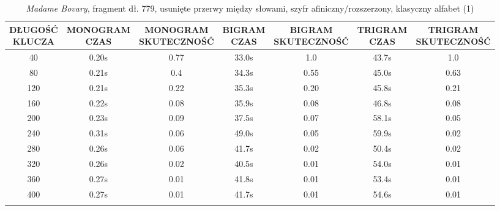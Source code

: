 \documentclass[a4paper]{article}
\theoremstyle{defn}
\theoremstyle{theorem}
\theoremstyle{lemma}
\theoremstyle{cor}
\theoremstyle{fact}
\begin{document}
\begin{center}\begin{small}\begin{longtable}{|c|c|c|c|c|c|c|}
\hline \makecell{DŁUGOŚĆ\\KLUCZA} &  \makecell{MONOGRAM\\CZAS} & \makecell{MONOGRAM\\SKUTECZNOŚĆ} & \makecell{BIGRAM\\CZAS} &  \makecell{BIGRAM\\SKUTECZNOŚĆ} & \makecell{TRIGRAM\\CZAS} & \makecell{TRIGRAM\\SKUTECZNOŚĆ}\\ \hline
40 & 0.20s & 0.77 & 33.0s & 1.0 & 43.7s & 1.0 \\ \hline
80 & 0.21s & 0.4 & 34.3s & 0.55 & 45.0s & 0.63 \\ \hline
120 & 0.21s & 0.22 & 35.3s & 0.20 & 45.8s & 0.21 \\ \hline
160 & 0.22s & 0.08 & 35.9s & 0.08 & 46.8s & 0.08 \\ \hline
200 & 0.23s & 0.09 & 37.5s & 0.07 & 58.1s & 0.05 \\ \hline
240 & 0.31s & 0.06 & 49.0s & 0.05 & 59.9s & 0.02 \\ \hline
280 & 0.26s & 0.06 & 41.7s & 0.02 & 50.4s & 0.02 \\ \hline
320 & 0.26s & 0.02 & 40.5s & 0.01 & 54.0s & 0.01 \\ \hline
360 & 0.27s & 0.01 & 41.8s & 0.01 & 53.4s & 0.01 \\ \hline
400 & 0.27s & 0.01 & 41.7s & 0.01 & 54.6s & 0.01 \\ \hline
\caption{\textit{Madame Bovary}, fragment dł. 779, usunięte przerwy między słowami, szyfr afiniczny/rozszerzony, klasyczny alfabet (1)}
\end{longtable}\end{small}\end{center}
\end{document}
